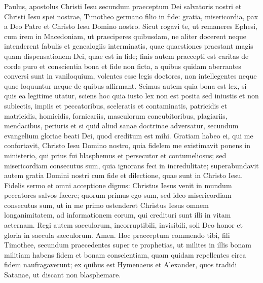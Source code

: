 \begin{biblechapter}
 \verse Paulus, apostolus Christi Iesu secundum praeceptum Dei salvatoris nostri et Christi Iesu spei nostrae, 
\verse Timotheo germano filio in fide: gratia, misericordia, pax a Deo Patre et Christo Iesu Domino nostro.
 \verse Sicut rogavi te, ut remaneres Ephesi, cum irem in Macedoniam, ut praeciperes quibusdam, ne aliter docerent 
\verse neque intenderent fabulis et genealogiis interminatis, quae quaestiones praestant magis quam dispensationem Dei, quae est in fide; 
\verse finis autem praecepti est caritas de corde puro et conscientia bona et fide non ficta, 
\verse a quibus quidam aberrantes conversi sunt in vaniloquium, 
\verse volentes esse legis doctores, non intellegentes neque quae loquuntur neque de quibus affirmant.
 \verse Scimus autem quia bona est lex, si quis ea legitime utatur, 
\verse sciens hoc quia iusto lex non est posita sed iniustis et non subiectis, impiis et peccatoribus, sceleratis et contaminatis, patricidis et matricidis, homicidis, 
\verse fornicariis, masculorum concubitoribus, plagiariis, mendacibus, periuris et si quid aliud sanae doctrinae adversatur, 
\verse secundum evangelium gloriae beati Dei, quod creditum est mihi.
 \verse Gratiam habeo ei, qui me confortavit, Christo Iesu Domino nostro, quia fidelem me existimavit ponens in ministerio, 
\verse qui prius fui blasphemus et persecutor et contumeliosus; sed misericordiam consecutus sum, quia ignorans feci in incredulitate; 
\verse superabundavit autem gratia Domini nostri cum fide et dilectione, quae sunt in Christo Iesu.
 \verse Fidelis sermo et omni acceptione dignus: Christus Iesus venit in mundum peccatores salvos facere; quorum primus ego sum, 
\verse sed ideo misericordiam consecutus sum, ut in me primo ostenderet Christus Iesus omnem longanimitatem, ad informationem eorum, qui credituri sunt illi in vitam aeternam.
 \verse Regi autem saeculorum, incorruptibili, invisibili, soli Deo honor et gloria in saecula saeculorum. Amen.
 \verse Hoc praeceptum commendo tibi, fili Timothee, secundum praecedentes super te prophetias, ut milites in illis bonam militiam 
\verse habens fidem et bonam conscientiam, quam quidam repellentes circa fidem naufragaverunt; 
\verse ex quibus est Hymenaeus et Alexander, quos tradidi Satanae, ut discant non blasphemare.
 

\end{biblechapter}
